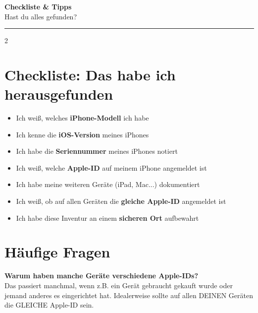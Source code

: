 \documentclass[a4paper,landscape,8pt]{extarticle}
\begin{document}
\newpage


\begin{center}
{\LARGE\bfseries Checkliste \& Tipps}\\[4pt]
{\large Hast du alles gefunden?}
\end{center}

\vspace{2mm}
\hrule
\vspace{6mm}

\begin{multicols}{2}

\section*{Checkliste: Das habe ich herausgefunden}

\begin{itemize}[label=$\square$, itemsep=6pt]
\item Ich weiß, welches \textbf{iPhone-Modell} ich habe
\item Ich kenne die \textbf{iOS-Version} meines iPhones
\item Ich habe die \textbf{Seriennummer} meines iPhones notiert
\item Ich weiß, welche \textbf{Apple-ID} auf meinem iPhone angemeldet ist
\item Ich habe meine weiteren Geräte (iPad, Mac...) dokumentiert
\item Ich weiß, ob auf allen Geräten die \textbf{gleiche Apple-ID} angemeldet ist
\item Ich habe diese Inventur an einem \textbf{sicheren Ort} aufbewahrt
\end{itemize}

\vspace{6mm}

\section*{Häufige Fragen}

\textbf{Warum haben manche Geräte verschiedene Apple-IDs?}\\
Das passiert manchmal, wenn z.B. ein Gerät gebraucht gekauft wurde oder jemand anderes es eingerichtet hat. Idealerweise sollte auf allen DEINEN Geräten die GLEICHE Apple-ID sein.


\end{multicols}
\end{document}
